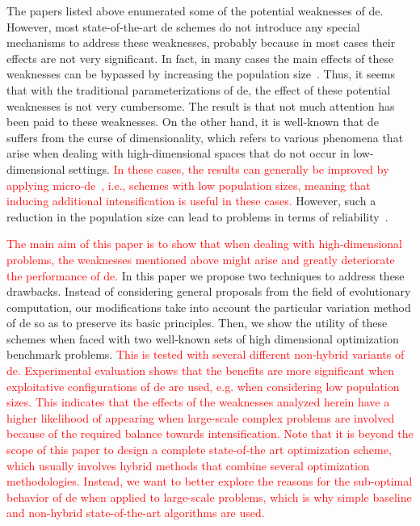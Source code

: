 \documentclass[review,3p]{elsarticle}
\newcommand{\DE}{{\sc de}}
\begin{document}
The papers listed above enumerated some of the potential weaknesses of \DE{}.
%
However, most state-of-the-art \DE{} schemes do not introduce any special mechanisms to address these weaknesses,
probably because in most cases their effects are not very significant.
%
In fact, in many cases the main effects of these weaknesses can be bypassed by increasing the population size~\cite{Lampinen:00}.
%
Thus, it seems that with the traditional parameterizations of \DE{},
the effect
of these potential weaknesses is not very cumbersome.
%
The result is that not much attention has been paid to these weaknesses.
%
On the other hand, it is well-known that \DE{} suffers from the curse of dimensionality, which refers
to various phenomena that arise when dealing with high-dimensional spaces that do not occur in low-dimensional settings.
%
%
\textcolor{red}{
In these cases, the results can generally be improved by applying micro-\DE{}~\cite{Olguin:13},
i.e., schemes with low population sizes, meaning that inducing additional intensification is useful
in these cases.
} 
%
However, such a reduction in the population size can lead to problems in terms of reliability~\cite{Zielinski:06}.

\textcolor{red}{
The main aim of this paper is to show that when dealing with high-dimensional problems, the weaknesses mentioned above might arise and greatly deteriorate
the performance of \DE{}.
}
%
In this paper we propose two techniques to address these drawbacks.
%
Instead of considering general proposals from the field of evolutionary computation, our modifications take into account
the particular variation method of \DE{} so as to preserve its basic principles.
%
Then, we show the utility of these schemes when faced with two well-known sets of high dimensional optimization benchmark problems.
%
\textcolor{red}{
This is tested with several different non-hybrid variants of \DE{}.
%
Experimental evaluation shows that the benefits are more significant when exploitative configurations
of \DE{} are used, e.g. when considering low population sizes.
}
%
%
%
%
\textcolor{red}{
This indicates that the effects of the weaknesses analyzed herein have a higher likelihood of appearing
when large-scale complex problems are involved because of the required balance towards intensification.
%
Note that it is beyond the scope of this paper to design a complete state-of-the art optimization scheme, 
which usually involves hybrid methods that combine several optimization methodologies.
%
Instead, we want to better explore the reasons for the sub-optimal behavior of \DE{}
when applied to large-scale problems,
which is why simple baseline and non-hybrid state-of-the-art algorithms are used.
}
%
\end{document}
